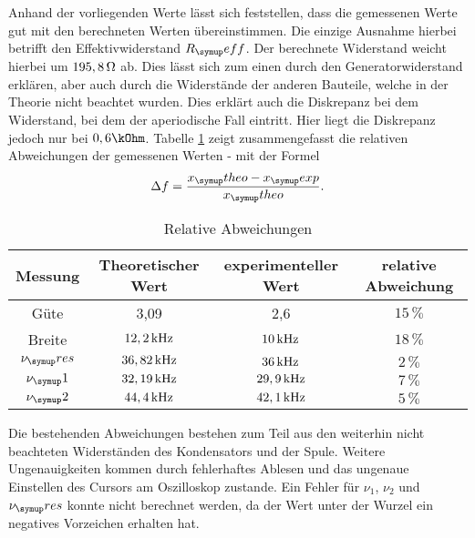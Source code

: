 Anhand der vorliegenden Werte lässt sich feststellen, dass die gemessenen
Werte gut mit den berechneten Werten übereinstimmen. Die einzige Ausnahme hierbei
betrifft den Effektivwiderstand $R_\su{eff}$. Der berechnete Widerstand weicht
hierbei um $195,8\,\si{\ohm}$ ab. Dies lässt sich zum einen durch den Generatorwiderstand
erklären, aber auch durch die Widerstände der anderen Bauteile, welche
in der Theorie nicht beachtet wurden. Dies erklärt auch die Diskrepanz bei dem
Widerstand, bei dem der aperiodische Fall eintritt. Hier liegt die Diskrepanz
jedoch nur bei $0,6\kOhm$.
Tabelle \ref{tab:fehler} zeigt zusammengefasst die relativen Abweichungen der
gemessenen Werten - mit der Formel
\begin{equation}
  \Delta f = \frac{x_\su{theo}-x_\su{exp}}{x_\su{theo}}.
\end{equation}
\begin{table}[!h]
  \centering
  \begin{tabular}{c c c c}
    \toprule
    Messung  & Theoretischer Wert & experimenteller Wert & relative Abweichung \\
     \midrule
     Güte & 3,09 & 2,6 & $15\,\si{\percent}$ \\
     Breite & $12,2\,\si{\kilo\hertz}$ & $10\,\si{\kilo\hertz}$ & $18\,\si{\percent}$ \\
     $\nu_\su{res}$ & $36,82\,\si{\kilo\hertz}$ & $36\,\si{\kilo\hertz}$ & $2\,\si{\percent}$ \\
     $\nu_\su{1}$ & $32,19\,\si{\kilo\hertz}$ & $29,9\,\si{\kilo\hertz}$ & $7\,\si{\percent}$ \\
     $\nu_\su{2}$ & $44,4\,\si{\kilo\hertz}$ & $42,1\,\si{\kilo\hertz}$ & $5\,\si{\percent}$ \\
     \bottomrule
  \end{tabular}
  \caption{Relative Abweichungen}
  \label{tab:fehler}
\end{table}

\noindent Die bestehenden Abweichungen bestehen zum Teil aus den weiterhin nicht
beachteten Widerständen des Kondensators und der Spule. Weitere Ungenauigkeiten
kommen durch fehlerhaftes Ablesen und das ungenaue Einstellen des Cursors
am Oszilloskop zustande.
Ein Fehler für $\nu_1$, $\nu_2$ und $\nu_\su{res}$ konnte nicht berechnet werden,
da der Wert unter der Wurzel ein negatives Vorzeichen erhalten hat.
